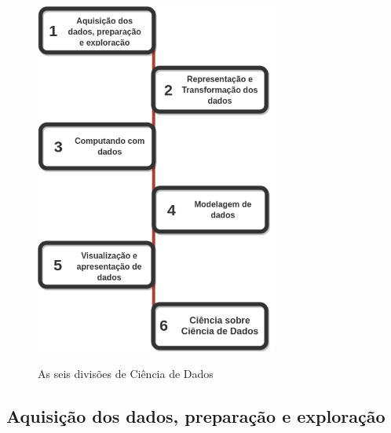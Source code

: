 \begin{figure}[ht]
    \caption{As seis divisões de Ciência de Dados \cite{donoho201750}}
    \centering %
    \includegraphics[width=8cm]{figuras/6divisoes_total.png}
    \label{figura_as_seis_divisoes}
    \end{figure}
    
\subsection*{Aquisição dos dados, preparação e exploração}

